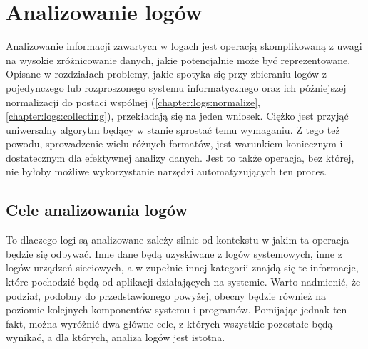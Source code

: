 \section{Analizowanie logów}
\label{chapter:logs:analysis}

Analizowanie informacji zawartych w logach jest operacją skomplikowaną z uwagi na wysokie zróżnicowanie danych, jakie
potencjalnie może być reprezentowane. Opisane w rozdziałach problemy, jakie spotyka się
przy zbieraniu logów z pojedynczego lub rozproszonego systemu informatycznego oraz ich 
późniejszej normalizacji do postaci wspólnej (\ref{chapter:logs:normalize}, \ref{chapter:logs:collecting}), 
przekładają się na jeden wniosek. Ciężko jest przyjąć uniwersalny algorytm będący w stanie sprostać temu wymaganiu.
Z tego też powodu, sprowadzenie wielu różnych formatów, jest warunkiem koniecznym i dostatecznym dla efektywnej
analizy danych. Jest to także operacja, bez której, nie byłoby możliwe wykorzystanie narzędzi automatyzujących
ten proces. 

    \subsection{Cele analizowania logów}
    
    To dlaczego logi są analizowane zależy silnie od kontekstu w jakim ta operacja będzie się odbywać. 
    Inne dane będą uzyskiwane z logów systemowych, inne z logów urządzeń sieciowych, a w zupełnie innej
    kategorii znajdą się te informacje, które pochodzić będą od aplikacji działających na systemie. Warto
    nadmienić, że podział, podobny do przedstawionego powyżej, obecny będzie również na poziomie
    kolejnych komponentów systemu i programów. Pomijając jednak ten fakt, 
    można wyróżnić dwa główne cele, z których wszystkie pozostałe będą wynikać,
    a dla których, analiza logów jest istotna.
    
